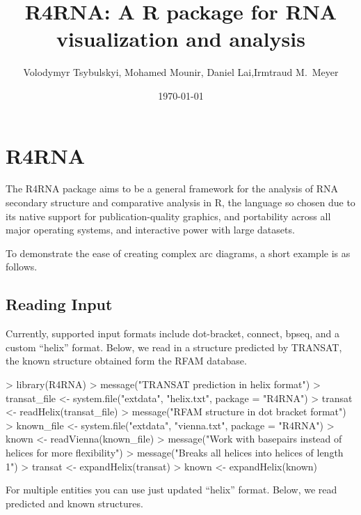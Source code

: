 \documentclass[letterpaper]{article}
\title{R4RNA: A R package for RNA visualization and analysis}
\author{Volodymyr Tsybulskyi, Mohamed Mounir, Daniel Lai,Irmtraud M.~Meyer}
\date{\today}
\begin{document}



\maketitle
\tableofcontents

\section{R4RNA}

The R4RNA package aims to be a general framework for the analysis of RNA
secondary structure and comparative analysis in R, the language so chosen due
to its native support for publication-quality graphics, and portability across
all major operating systems, and interactive power with large datasets.

To demonstrate the ease of creating complex arc diagrams, a short example is
as follows.

\subsection{Reading Input}

Currently, supported input formats include dot-bracket, connect, bpseq, and a
custom ``helix'' format.  Below, we read in a structure predicted by TRANSAT,
the known structure obtained form the RFAM database.

\begin{Schunk}
\begin{Sinput}
> library(R4RNA)
> message("TRANSAT prediction in helix format")
> transat_file <- system.file("extdata", "helix.txt", package = "R4RNA")
> transat <- readHelix(transat_file)
> message("RFAM structure in dot bracket format")
> known_file <- system.file("extdata", "vienna.txt", package = "R4RNA")
> known <- readVienna(known_file)
> message("Work with basepairs instead of helices for more flexibility")
> message("Breaks all helices into helices of length 1")
> transat <- expandHelix(transat)
> known <- expandHelix(known)
\end{Sinput}
\end{Schunk}

For multiple entities you can use just updated ``helix'' format. Below, we read predicted and known structures.
\end{document}
